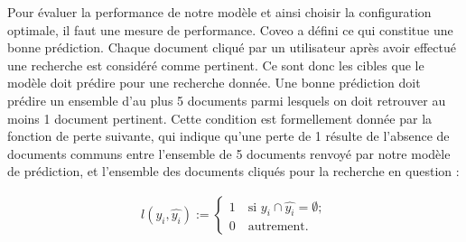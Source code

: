 Pour évaluer la performance de notre modèle et ainsi choisir la configuration optimale, il faut une mesure de performance. Coveo a défini ce qui constitue une bonne prédiction. Chaque document cliqué par un utilisateur après avoir effectué une recherche est considéré comme pertinent. Ce sont donc les cibles que le modèle doit prédire pour une recherche donnée. Une bonne prédiction doit prédire un ensemble d'au plus 5 documents parmi lesquels on doit retrouver au moins 1 document pertinent. Cette condition est formellement donnée par la fonction de perte suivante, qui indique qu'une perte de 1 résulte de l'absence de documents communs entre l'ensemble de 5 documents renvoyé par notre modèle de prédiction, et l'ensemble des documents cliqués pour la recherche en question :

\begin{gather}
l(y_i, \widehat{y_i}):=\left\{
                          \begin{array}{ll}
                            1 \quad\text{si } y_i \cap \widehat{y_i}=\emptyset; \\
                            0 \quad\text{autrement}.
                          \end{array}
                        \right.
\end{gather}


